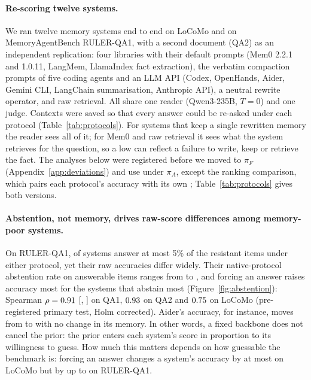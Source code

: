 \paragraph{Re-scoring twelve systems.} We ran twelve memory systems end to end on LoCoMo and on MemoryAgentBench
RULER-QA1, with a second document (QA2) as an independent replication: four libraries with their default prompts
(Mem0 2.2.1 and 1.0.11, LangMem, LlamaIndex fact extraction), the verbatim compaction prompts of five coding agents and
an LLM API (Codex, OpenHands, Aider, Gemini CLI, LangChain summarisation, Anthropic API), a neutral rewrite operator, and
raw retrieval. All share one reader (Qwen3-235B, $T{=}0$) and one judge. Contexts were saved so that every answer could
be re-asked under each protocol (Table~\ref{tab:protocols}). For systems that keep a single rewritten memory the reader
sees all of it; for Mem0 and raw retrieval it sees what the system retrieves for the question, so a low \cpr{} can reflect
a failure to write, keep or retrieve the fact. The analyses below were registered before we moved \cpr{} to $\pi_F$
(Appendix~\ref{app:deviations}) and use \cpr{} under $\pi_A$, except the ranking comparison, which pairs each protocol's
accuracy with its own \cpr{}; Table~\ref{tab:protocols} gives both versions.



\paragraph{Abstention, not memory, drives raw-score differences among memory-poor systems.} On RULER-QA1,
\nPoorQaOne{} of \nSysQaOne{} systems answer at most 5\% of the resistant items under either protocol, yet their raw accuracies differ widely.
Their native-protocol abstention rate on answerable items ranges from \absRangeLo{} to \absRangeHi{}, and forcing an
answer raises accuracy most for the systems that abstain most (Figure~\ref{fig:abstention}): Spearman $\rho=0.91$
[\hOneQaOneLo, \hOneQaOneHi] on QA1, $0.93$ on QA2 and $0.75$ on LoCoMo (pre-registered primary test, Holm
corrected). Aider's accuracy, for instance, moves from \aiderAccA{} to \aiderAccF{} with no change in its memory. In
other words, a fixed backbone does not cancel the prior: the prior enters each system's score in proportion to its
willingness to guess. How much this matters depends on how guessable the benchmark is: forcing an answer changes a
system's accuracy by at most \gainMaxLocomo{} on LoCoMo but by up to \gainMaxQaOne{} on RULER-QA1.

